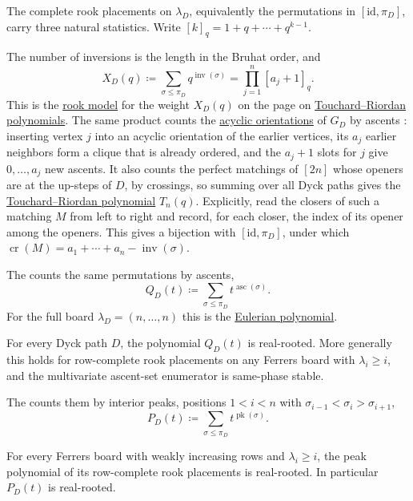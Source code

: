 The complete rook placements on $\lambda_D$, equivalently the permutations in
$[\mathrm{id},\pi_D]$, carry three natural statistics.  Write
$[k]_q=1+q+\dotsb+q^{k-1}$.

The number of inversions is the length in the Bruhat order, and
\[
  X_D(q)\coloneqq\sum_{\sigma\leq\pi_D}q^{\operatorname{inv}(\sigma)}
  =\prod_{j=1}^{n}[a_j+1]_q.
\]
This is the \hyperref[aoRooks]{rook model} for the weight
$X_D(q)$ on the page on \hyperref[unitIntervalAO]{Touchard--Riordan
polynomials}.  The same product counts the
\hyperref[aoOnUnitIntervalGraphs]{acyclic orientations} of $G_D$ by ascents
\cite[Sec.~9]{AlexanderssonPanova2018}: inserting vertex $j$ into an acyclic
orientation of the earlier vertices, its $a_j$ earlier neighbors form a clique
that is already ordered, and the $a_j+1$ slots for $j$ give $0,\dotsc,a_j$ new
ascents.  It also counts the perfect matchings of $[2n]$ whose openers are at
the up-steps of $D$, by crossings, so summing over all Dyck paths gives the
\hyperref[touchardRiordanPolynomialDefinition]{Touchard--Riordan polynomial}
$T_n(q)$.  Explicitly, read the closers of such a matching $M$ from left to
right and record, for each closer, the index of its opener among the openers.
This gives a bijection with $[\mathrm{id},\pi_D]$, under which
$\operatorname{cr}(M)=a_1+\dotsb+a_n-\operatorname{inv}(\sigma)$.

The \label{dyckPathRookEulerian} counts the
same permutations by ascents,
\[
  Q_D(t)\coloneqq\sum_{\sigma\leq\pi_D}t^{\operatorname{asc}(\sigma)}.
\]
For the full board $\lambda_D=(n,\dotsc,n)$ this is the
\hyperref[eulerianPolynomial]{Eulerian polynomial}.

\begin{theorem}
For every Dyck path $D$, the polynomial $Q_D(t)$ is real-rooted.  More
generally this holds for row-complete rook placements on any Ferrers board with
$\lambda_i\geq i$, and the multivariate ascent-set enumerator is same-phase
stable.
\end{theorem}

The \label{dyckPathPeakPolynomial} counts them by
interior peaks, positions $1<i<n$ with $\sigma_{i-1}<\sigma_i>\sigma_{i+1}$,
\[
  P_D(t)\coloneqq\sum_{\sigma\leq\pi_D}t^{\operatorname{pk}(\sigma)}.
\]

\begin{theorem}
For every Ferrers board with weakly increasing rows and $\lambda_i\geq i$, the
peak polynomial of its row-complete rook placements is real-rooted.  In
particular $P_D(t)$ is real-rooted.
\end{theorem}

